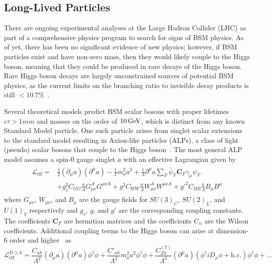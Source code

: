 \subsection{Long-Lived Particles} \label{sec:LLPs}
There are ongoing experimental analyses at the Large Hadron Collider (LHC) as part of a comprehensive physics program to search for signs of BSM physics. As of yet, there has been no significant evidence of new physics; however, if BSM particles exist and have non-zero mass, then they would likely couple to the Higgs boson, meaning that they could be produced in rare decays of the Higgs boson. Rare Higgs boson decays are largely unconstrained sources of potential BSM physics, as the current limits on the branching ratio to invisible decay products is still $<10.7\%$~\cite{pdg2024}.

Several theoretical models predict BSM scalar bosons with proper lifetimes $c\tau>1\unit{mm}$ and masses on the order of $10\,\text{Ge\hspace{-.08em}V}$, which is distinct from any known Standard Model particle. One such particle arises from singlet scalar extensions to the standard model resulting in Axion-like particles (ALPs), a class of light (pseudo) scalar bosons that couple to the Higgs boson~\cite{atlas_alp}. The most general ALP model assumes a spin-0 gauge singlet $a$ with an effective Lagrangian given by~\cite{alp_colliders}
\begin{align}
	\label{eq:alp_lagrangian}
	\begin{split}
		\mathcal{L}_\text{eff}=&\frac{1}{2}\left(\partial_\mu a\right)\left(\partial^\mu a\right)-\frac{1}{2}m_a^2a^2+\frac{1}{\Lambda}\partial^\mu a\sum_{F}\bar{\psi}_F\mathbf{C}_F\gamma_\mu\psi_F\\
		&+g_s^2C_{GG}\frac{a}{\Lambda}G_{\mu\nu}^AG^{\mu\nu A}+g^2C_{WW}\frac{a}{\Lambda}W_{\mu\nu}^AW^{\mu\nu A}+g'^2C_{BB}\frac{a}{\Lambda}B_\mu B^\mu
	\end{split}
\end{align}
where $G_{\mu\nu}$, $W_{\mu\nu}$, and $B_\mu$ are the gauge fields for $SU(3)_C$, $SU(2)_L$, and $U(1)_Y$ respectively and $g_s$, $g$, and $g'$ are the corresponding coupling constants. The coefficients $\mathbf{C}_F$ are hermitian matrices and the coefficients $C_{ii}$ are the Wilson coefficients. Additional coupling terms to the Higgs boson can arise at dimension-6 order and higher~\cite{alp_colliders} as
\begin{equation}
	\label{eq:alp_6d_lagrangian}
	\mathcal{L}_\text{eff}^{D\geq6}=\frac{C_{ah}}{\Lambda^2}(\partial_\mu a)(\partial^\mu a)\phi^\dagger\phi+\frac{C'_{ah}}{\Lambda^2}m_a^2a^2\phi^\dagger\phi+\frac{C_{Zh}^{(7)}}{\Lambda^3}(\partial^\mu a)(\phi^\dagger iD_\mu\phi+\text{h.c.})\phi^\dagger\phi+...
\end{equation}
